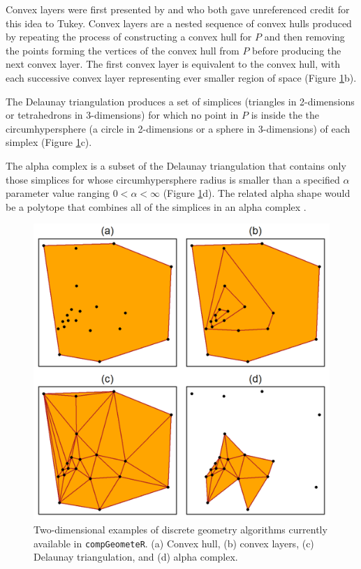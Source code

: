 \documentclass[12pt, a4paper]{article}
\begin{document}
Convex layers were first presented by \cite{huber-1972} and \cite{barnett-1976} who both gave unreferenced credit for this idea to Tukey.  Convex layers are a nested sequence of convex hulls produced by repeating the process of constructing a convex hull for $P$ and then removing the points forming the vertices of the convex hull from $P$ before producing the next convex layer.  The first convex layer is equivalent to the convex hull, with each successive convex layer representing ever smaller region of space (Figure \ref{fig:discrete-algorithms}b).

The Delaunay triangulation \citep{delaunay-1934} produces a set of simplices (triangles in 2-dimensions or tetrahedrons in 3-dimensions) for which no point in $P$ is inside the the circumhypersphere (a circle in 2-dimensions or a sphere in 3-dimensions) of each simplex (Figure \ref{fig:discrete-algorithms}c).

The alpha complex \citep{edelsbrunner-1994} is a subset of the Delaunay triangulation that contains only those simplices for whose circumhypersphere radius is smaller than a specified $\alpha$ parameter value ranging $0 < \alpha < \infty$ (Figure \ref{fig:discrete-algorithms}d).  The related alpha shape would be a polytope that combines all of the simplices in an alpha complex \citep{edelsbrunner-1994}.

\begin{figure}[ht]
\centering
\includegraphics{figures/discrete-algorithms/discrete-algorithms.png}
\caption{Two-dimensional examples of discrete geometry algorithms currently available in \texttt{compGeometeR}. (a) Convex hull, (b) convex layers, (c) Delaunay triangulation, and (d) alpha complex.}
\label{fig:discrete-algorithms}
\end{figure}
\end{document}
